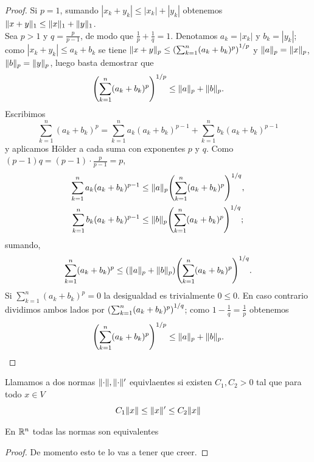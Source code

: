 \begin{proof}
  Si $p=1$, sumando $|x_k+y_k|\le |x_k|+|y_k|$ obtenemos $\norm{x+y}_1\le \norm{x}_1+\norm{y}_1$.\\
  Sea $p>1$ y $q=\frac{p}{p-1}$, de modo que $\frac{1}{p}+\frac{1}{q}=1$. Denotamos $a_k=|x_k|$ y $b_k=|y_k|$; como $|x_k+y_k|\le a_k+b_k$ se tiene $\norm{x+y}_p\le \parens*{\sum_{k=1}^n(a_k+b_k)^p}^{1/p}$ y $\norm{a}_p=\norm{x}_p$, $\norm{b}_p=\norm{y}_p$, luego basta demostrar que \[
    \parens*{\sum_{k=1}^n(a_k+b_k)^p}^{1/p}\le \norm{a}_p+\norm{b}_p.
  \]
  Escribimos
  \[
    \sum_{k=1}^n (a_k+b_k)^p = \sum_{k=1}^n a_k(a_k+b_k)^{p-1}+\sum_{k=1}^n b_k(a_k+b_k)^{p-1}
  \]
  y aplicamos Hölder a cada suma con exponentes $p$ y $q$. Como $(p-1)q=(p-1)\cdot\frac{p}{p-1}=p$,
  \begin{align*}
    \sum_{k=1}^n a_k(a_k+b_k)^{p-1}&\le \norm{a}_p\parens*{\sum_{k=1}^n(a_k+b_k)^p}^{1/q},\\
    \sum_{k=1}^n b_k(a_k+b_k)^{p-1}&\le \norm{b}_p\parens*{\sum_{k=1}^n(a_k+b_k)^p}^{1/q};
  \end{align*}
  sumando,
  \[
    \sum_{k=1}^n(a_k+b_k)^p\le \parens*{\norm{a}_p+\norm{b}_p}\parens*{\sum_{k=1}^n(a_k+b_k)^p}^{1/q}.
  \]
  Si $\sum_{k=1}^n(a_k+b_k)^p=0$ la desigualdad es trivialmente $0\le 0$. En caso contrario dividimos ambos lados por $\parens*{\sum_{k=1}^n(a_k+b_k)^p}^{1/q}$; como $1-\frac{1}{q}=\frac{1}{p}$ obtenemos
  \[
    \parens*{\sum_{k=1}^n(a_k+b_k)^p}^{1/p}\le \norm{a}_p+\norm{b}_p.
  \]
\end{proof}
\begin{theorem}
\end{theorem}
\begin{definition}
  Llamamos a dos normas $\norm{\cdot}, \norm{\cdot}'$ equivlaentes si existen $C_1,C_2>0$ tal que para todo $x\in V$ \[
      C_1 \norm{x}\le \norm{x}' \le C_2\norm{x}
  \] 
\end{definition}
\begin{theorem}\label{thm:equivalencia_de_normas_en_Rn}
  En $\R^n$ todas las normas son equivalentes
\end{theorem}
\begin{proof}
  De momento esto te lo vas a tener que creer.
\end{proof}

